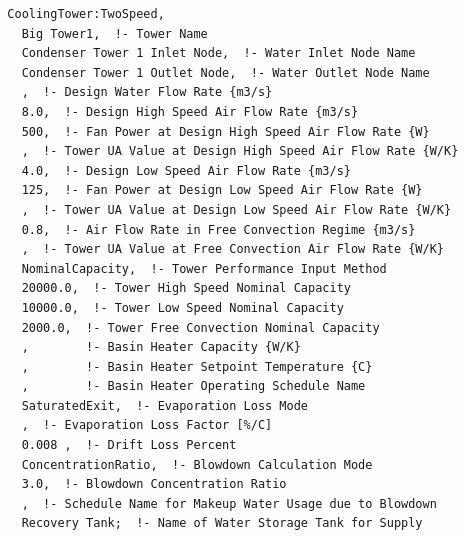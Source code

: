 \begin{lstlisting}
  CoolingTower:TwoSpeed,
    Big Tower1,  !- Tower Name
    Condenser Tower 1 Inlet Node,  !- Water Inlet Node Name
    Condenser Tower 1 Outlet Node,  !- Water Outlet Node Name
    ,  !- Design Water Flow Rate {m3/s}
    8.0,  !- Design High Speed Air Flow Rate {m3/s}
    500,  !- Fan Power at Design High Speed Air Flow Rate {W}
    ,  !- Tower UA Value at Design High Speed Air Flow Rate {W/K}
    4.0,  !- Design Low Speed Air Flow Rate {m3/s}
    125,  !- Fan Power at Design Low Speed Air Flow Rate {W}
    ,  !- Tower UA Value at Design Low Speed Air Flow Rate {W/K}
    0.8,  !- Air Flow Rate in Free Convection Regime {m3/s}
    ,  !- Tower UA Value at Free Convection Air Flow Rate {W/K}
    NominalCapacity,  !- Tower Performance Input Method
    20000.0,  !- Tower High Speed Nominal Capacity
    10000.0,  !- Tower Low Speed Nominal Capacity
    2000.0,  !- Tower Free Convection Nominal Capacity
    ,        !- Basin Heater Capacity {W/K}
    ,        !- Basin Heater Setpoint Temperature {C}
    ,        !- Basin Heater Operating Schedule Name
    SaturatedExit,  !- Evaporation Loss Mode
    ,  !- Evaporation Loss Factor [%/C]
    0.008 ,  !- Drift Loss Percent
    ConcentrationRatio,  !- Blowdown Calculation Mode
    3.0,  !- Blowdown Concentration Ratio
    ,  !- Schedule Name for Makeup Water Usage due to Blowdown
    Recovery Tank;  !- Name of Water Storage Tank for Supply



\end{lstlisting}
